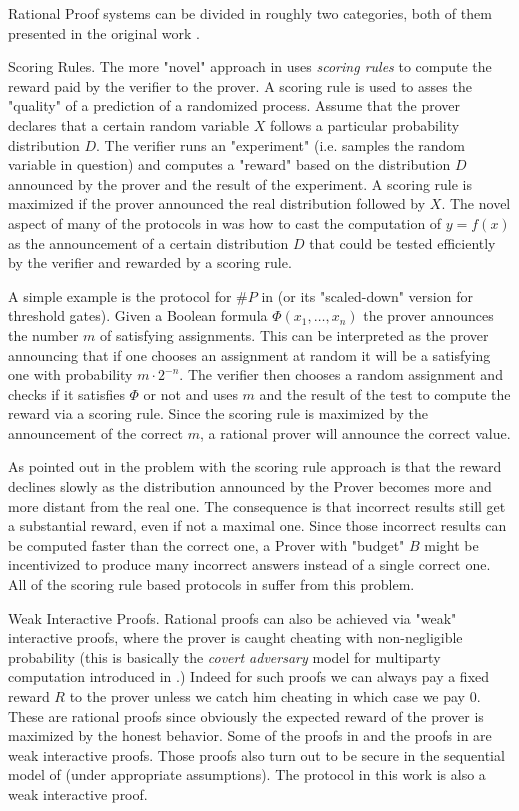 Rational Proof systems can be divided in roughly two categories, both of them presented in the original work \cite{am}. 

\medskip
\noindent
{\sc Scoring Rules.}
The more "novel" approach in \cite{am} uses {\em scoring rules} to compute the reward paid by the verifier to the prover. A scoring rule is used to asses the "quality" of a prediction of a randomized process. Assume that the prover declares that a certain random variable $X$ follows a particular probability distribution $D$. The verifier runs an "experiment" (i.e. samples the random variable in question) and computes a "reward" based on the distribution $D$ announced by the prover and the result of the experiment. A scoring rule is maximized if the prover announced the real distribution followed by $X$. The novel aspect of many of the protocols in \cite{am} was how to cast the computation of $y=f(x)$ as the announcement of a certain distribution $D$ that could be tested efficiently by the verifier and rewarded by a scoring rule. 

A simple example is the protocol for $\#P$ in \cite{am} (or its "scaled-down" version for threshold gates). Given a Boolean formula $\Phi(x_1,\ldots,x_n)$ the prover announces the number $m$ of satisfying assignments. This can be interpreted as the prover announcing that if one chooses an assignment at random it will be a satisfying one with probability $m \cdot 2^{-n}$. The verifier then chooses a random assignment and checks if it satisfies $\Phi$ or not and uses $m$ and the result of the test to compute the reward via a scoring rule. Since the scoring rule is maximized by the announcement of the correct $m$, a rational prover will announce the correct value. 

As pointed out in \cite{cg15} the problem with the scoring rule approach is that the reward declines slowly as the distribution announced by the Prover becomes more and more distant from the real one. The consequence is that incorrect results still get a substantial reward, even if not a maximal one. Since those incorrect results can be computed faster than the correct one, a Prover with "budget" $B$ might be incentivized to produce many incorrect answers instead of a single correct one. All of the scoring rule based protocols in \cite{am,am1,ratargs,ratsumchecks} suffer from this problem. 

\medskip
\noindent
{\sc Weak Interactive Proofs.}
Rational proofs can also be achieved via "weak" interactive proofs, where the prover is caught cheating with non-negligible probability (this is basically the {\em covert adversary} model for multiparty computation introduced in \cite{AL10}.) Indeed for such proofs we can always pay a fixed reward $R$ to the prover unless we catch him cheating in which case we pay $0$. These are rational proofs since obviously the expected reward of the prover is maximized by the honest behavior. Some of the proofs in \cite{am} and the proofs in \cite{cg15} are weak interactive proofs. Those proofs also turn out to be secure in the sequential model of \cite{cg15} (under appropriate assumptions). The protocol in this work is also a weak interactive proof. 


